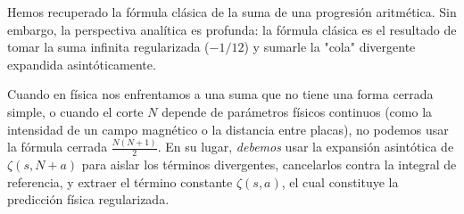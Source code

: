 Hemos recuperado la fórmula clásica de la suma de una progresión aritmética. Sin embargo, la perspectiva analítica es profunda: la fórmula clásica es el resultado de tomar la suma infinita regularizada ($-1/12$) y sumarle la "cola" divergente expandida asintóticamente. 

Cuando en física nos enfrentamos a una suma que no tiene una forma cerrada simple, o cuando el corte $N$ depende de parámetros físicos continuos (como la intensidad de un campo magnético o la distancia entre placas), no podemos usar la fórmula cerrada $\frac{N(N+1)}{2}$. En su lugar, \textit{debemos} usar la expansión asintótica de $\zeta(s, N+a)$ para aislar los términos divergentes, cancelarlos contra la integral de referencia, y extraer el término constante $\zeta(s, a)$, el cual constituye la predicción física regularizada.
